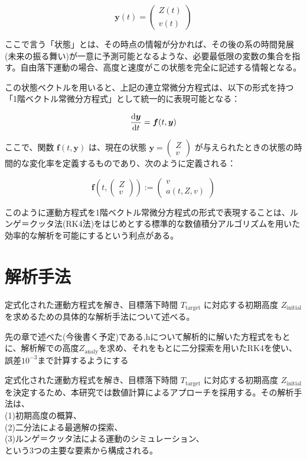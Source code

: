 \documentclass[a4paper,12pt]{article}
\begin{document}
\[
\bm{y}(t) = \begin{pmatrix} Z(t) \\ v(t) \end{pmatrix}
\]

ここで言う「状態」とは、その時点の情報が分かれば、その後の系の時間発展(未来の振る舞い)が一意に予測可能となるような、必要最低限の変数の集合を指す。自由落下運動の場合、高度と速度がこの状態を完全に記述する情報となる。

この状態ベクトルを用いると、上記の連立常微分方程式は、以下の形式を持つ「1階ベクトル常微分方程式」として統一的に表現可能となる：

\[
\dv{\bm{y}}{t} = \bm{f}(t, \bm{y})
\]

ここで、関数 $\bm{f}(t, \bm{y})$ は、現在の状態 $\bm{y} = \begin{pmatrix} Z \\ v \end{pmatrix}$ が与えられたときの状態の時間的な変化率を定義するものであり、次のように定義される：

\[
\bm{f}\left(t, \begin{pmatrix} Z \\ v \end{pmatrix}\right) := \begin{pmatrix} v \\ a(t, Z, v) \end{pmatrix}
\]

このように運動方程式を1階ベクトル常微分方程式の形式で表現することは、ルンゲ＝クッタ法(RK4法)をはじめとする標準的な数値積分アルゴリズムを用いた効率的な解析を可能にするという利点がある。

\section{解析手法}


定式化された運動方程式を解き、目標落下時間 $T_{\mathrm{target}}$ に対応する初期高度 $Z_{\mathrm{initial}}$ を求めるための具体的な解析手法について述べる。

先の章で述べた(今後書く予定)である,hについて解析的に解いた方程式をもとに、解析解での高度$Z_{\mathrm{analy}}$を求め、それをもとに二分探索を用いたRK4を使い、誤差$10^{-3}$まで計算するようにする

\label{sec:method}

定式化された運動方程式を解き、目標落下時間 $T_{\mathrm{target}}$ に対応する初期高度 $Z_{\mathrm{initial}}$ を決定するため、本研究では数値計算によるアプローチを採用する。その解析手法は、
\\(1)初期高度の概算、
\\(2)二分法による最適解の探索、
\\(3)ルンゲ＝クッタ法による運動のシミュレーション、\\という3つの主要な要素から構成される。
\end{document}
